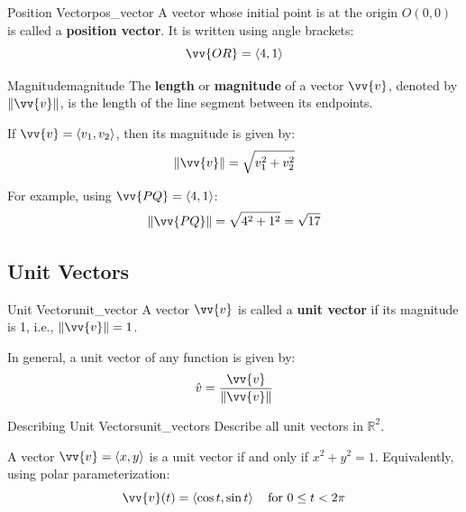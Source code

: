 \begin{definition}{Position Vector}{pos_vector}
A vector whose initial point is at the origin $O(0,0)$ is called a \textbf{position vector}. It is written using angle brackets:
\[
\vv{OR} = \ang{4, 1}
\]
\end{definition}

\begin{definition}{Magnitude}{magnitude}
The \textbf{length} or \textbf{magnitude} of a vector $\vv{v}$, denoted by $\norm{\vv{v}}$, is the length of the line segment between its endpoints.
\end{definition}

If $\vv{v} = \ang{v_1, v_2}$, then its magnitude is given by:
\[
\norm{\vv{v}} = \sqrt{v_1^2 + v_2^2}
\]

For example, using $\vv{PQ} = \ang{4,1}$:
\[
\norm{\vv{PQ}} = \sqrt{4^2 + 1^2} = \sqrt{17}
\]

\subsection{Unit Vectors}

\begin{definition}{Unit Vector}{unit_vector}
A vector $\vv{v}$ is called a \textbf{unit vector} if its magnitude is 1, i.e., $\norm{\vv{v}} = 1$.

In general, a unit vector of any function is given by:
\[
\hat{v} = \frac{\vv{v}}{\norm{\vv{v}}}
\]
\end{definition}

\begin{problem}{Describing Unit Vectors}{unit_vectors}
Describe all unit vectors in $\mathbb{R}^2$.
\end{problem}

\begin{sol}
A vector $\vv{v} = \ang{x, y}$ is a unit vector if and only if $x^2 + y^2 = 1$. Equivalently, using polar parameterization:
\[
\vv{v}(t) = \ang{\cos t, \sin t} \quad \text{for } 0 \le t < 2\pi
\]
\begin{center}
\end{center}
\end{sol}

